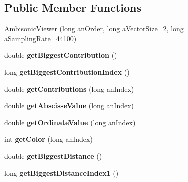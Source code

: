 \subsection*{Public Member Functions}
\begin{DoxyCompactItemize}
\item 
\hyperlink{class_ambisonic_viewer_aed38fd89c057c2b707a2bc5e91b17861}{Ambisonic\-Viewer} (long an\-Order, long a\-Vector\-Size=2, long a\-Sampling\-Rate=44100)
\item 
\hypertarget{class_ambisonic_viewer_a16a1252432e93df0c119da90870ad31e}{double {\bfseries get\-Biggest\-Contribution} ()}\label{class_ambisonic_viewer_a16a1252432e93df0c119da90870ad31e}

\item 
\hypertarget{class_ambisonic_viewer_a830f9c19061c719f89c11cc61eff34bc}{long {\bfseries get\-Biggest\-Contribution\-Index} ()}\label{class_ambisonic_viewer_a830f9c19061c719f89c11cc61eff34bc}

\item 
\hypertarget{class_ambisonic_viewer_a11edb6e5a96dc22f1b157400a97269d9}{double {\bfseries get\-Contributions} (long an\-Index)}\label{class_ambisonic_viewer_a11edb6e5a96dc22f1b157400a97269d9}

\item 
\hypertarget{class_ambisonic_viewer_ab766f31a40ba2075004a7333d0d820d2}{double {\bfseries get\-Abscisse\-Value} (long an\-Index)}\label{class_ambisonic_viewer_ab766f31a40ba2075004a7333d0d820d2}

\item 
\hypertarget{class_ambisonic_viewer_a8bfe7fe9838a0442e601fc636f771350}{double {\bfseries get\-Ordinate\-Value} (long an\-Index)}\label{class_ambisonic_viewer_a8bfe7fe9838a0442e601fc636f771350}

\item 
\hypertarget{class_ambisonic_viewer_a938c561871b17dd6b5d10d83d1c313ae}{int {\bfseries get\-Color} (long an\-Index)}\label{class_ambisonic_viewer_a938c561871b17dd6b5d10d83d1c313ae}

\item 
\hypertarget{class_ambisonic_viewer_a25ae915e8eb4bd683baa1a02008156c0}{double {\bfseries get\-Biggest\-Distance} ()}\label{class_ambisonic_viewer_a25ae915e8eb4bd683baa1a02008156c0}

\item 
\hypertarget{class_ambisonic_viewer_a95c3cc92e1fb070647b70de6a50caeb8}{long {\bfseries get\-Biggest\-Distance\-Index1} ()}\label{class_ambisonic_viewer_a95c3cc92e1fb070647b70de6a50caeb8}


\end{DoxyCompactItemize}
